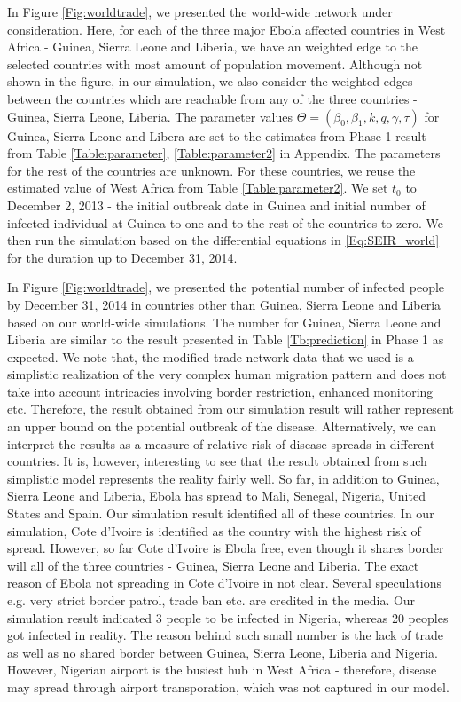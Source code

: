 \documentclass[10pt, journal,onecolumn]{IEEEtran}
\begin{document}
In Figure \ref{Fig:worldtrade}, we presented the world-wide network under consideration. Here, for each of the three major Ebola affected countries in West Africa - Guinea, Sierra Leone and Liberia, we have an weighted edge to the selected countries with most amount of population movement. Although not shown in the figure, in our simulation, we also consider the weighted edges between the countries which are reachable from any of the three countries -  Guinea, Sierra Leone,  Liberia.  The parameter values $\Theta=(\beta_0,\beta_1,k,q,\gamma, \tau)$ for Guinea, Sierra Leone and Libera are set to the estimates from Phase 1 result from Table \ref{Table:parameter}, \ref{Table:parameter2} in Appendix. The parameters for the rest of the countries are unknown. For these countries, we reuse the estimated value of West Africa from Table \ref{Table:parameter2}. We set $t_0$ to December 2, 2013 - the initial outbreak date in Guinea and initial number of infected individual at Guinea to one and to the rest of the countries to zero. We then run the simulation based on the differential equations in \eqref{Eq:SEIR_world} for the duration up to December 31, 2014.

In Figure \ref{Fig:worldtrade}, we presented the potential number of infected people by December 31, 2014 in countries other than Guinea, Sierra Leone and Liberia based on our world-wide simulations. The number for Guinea, Sierra Leone and Liberia are similar to the result presented in Table \ref{Tb:prediction} in Phase 1 as expected. We note that, the modified trade network data that we used is a simplistic realization of the very complex human migration pattern and does not take into account intricacies involving border restriction, enhanced monitoring etc. Therefore, the result obtained from our simulation result will rather represent  an upper bound on the potential outbreak of the disease. Alternatively, we can interpret the results as a measure of relative risk of disease spreads in different countries. It is, however, interesting to see that the result obtained from such simplistic model represents the reality fairly well. So far, in addition to  Guinea, Sierra Leone and Liberia, Ebola has spread to Mali, Senegal, Nigeria, United States and Spain. Our simulation result identified all of these countries. In our simulation, Cote d'Ivoire is identified as the country with the highest risk of spread. However, so far Cote d'Ivoire is Ebola free, even though it shares border will all of the three countries - Guinea, Sierra Leone and Liberia. The exact reason of Ebola not spreading in Cote d'Ivoire in not clear. Several speculations e.g. very strict border patrol, trade ban etc. are credited in the media. Our simulation result indicated 3 people to be infected in Nigeria, whereas 20 peoples got infected in reality. The reason behind such small number is the lack of trade as well as no shared border between Guinea, Sierra Leone, Liberia and Nigeria. However, Nigerian airport is the busiest hub in West Africa - therefore, disease may spread through airport transporation, which was not captured in our model.
\end{document}
